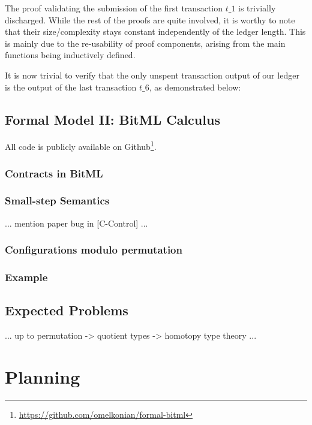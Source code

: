 \documentclass[acmsmall,nonacm=true,screen=true]{acmart}
\newcommand\site[1]{\footnote{\url{#1}}}
\begin{document}
\UTXOexampleB{}

\noindent
The proof validating the submission of the first transaction $t\_1$ is trivially discharged.
While the rest of the proofs are quite involved, it is worthy to note that their size/complexity stays constant
independently of the ledger length. This is mainly due to the re-usability of proof components, arising from
the main functions being inductively defined.

It is now trivial to verify that the only unspent transaction output of our ledger is the output of the last
transaction $t\_6$, as demonstrated below:

\UTXOexampleC{}

\subsection{Formal Model II: BitML Calculus} \label{subsec:bitml}
All code is publicly available on Github\site{https://github.com/omelkonian/formal-bitml}.

\subsubsection{Contracts in BitML}

\subsubsection{Small-step Semantics}

... mention paper bug in [C-Control] ...

\subsubsection{Configurations modulo permutation}

\subsubsection{Example}

\subsection{Expected Problems}

... up to permutation -> quotient types -> homotopy type theory ...

\newpage
\section{Planning}
\label{sec:plan}
\end{document}
